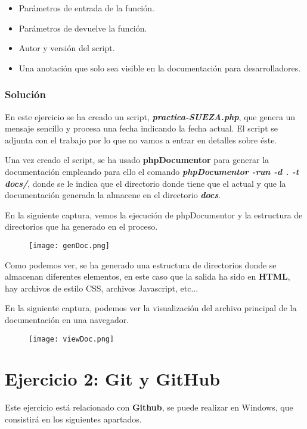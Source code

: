 \begin{itemize}
    \item Parámetros de entrada de la función.
    \item Parámetros de devuelve la función.
    \item Autor y versión del script.
    \item Una anotación que solo sea visible en la documentación para desarrolladores.
\end{itemize}

\subsubsection{Solución}
En este ejercicio se ha creado un script, \textbf{\textit{practica-SUEZA.php}}, que genera un mensaje sencillo y procesa una fecha indicando la fecha actual. El script se adjunta con el trabajo por lo que no vamos a entrar en detalles sobre éste.

Una vez creado el script, se ha usado \textbf{phpDocumentor} para generar la documentación empleando para ello el comando \textbf{\textit{phpDocumentor -run -d . -t docs/}}, donde se le indica que el directorio donde tiene que el actual y que la documentación generada la almacene en el directorio \textbf{\textit{docs}}.

En la siguiente captura, vemos la ejecución de phpDocumentor y la estructura de directorios que ha generado en el proceso.

\begin{figure}[H]
    \centering
    \texttt{[image: genDoc.png]}
\end{figure}

Como podemos ver, se ha generado una estructura de directorios donde se almacenan diferentes elementos, en este caso que la salida ha sido en \textbf{HTML}, hay archivos de estilo CSS, archivos Javascript, etc...

En la siguiente captura, podemos ver la visualización del archivo principal de la documentación en una navegador.

\begin{figure}[H]
    \centering
    \texttt{[image: viewDoc.png]}
\end{figure}

\section{Ejercicio 2: Git y GitHub}
Este ejercicio está relacionado con \textbf{Github}, se puede realizar en Windows, que consistirá en los siguientes apartados.

